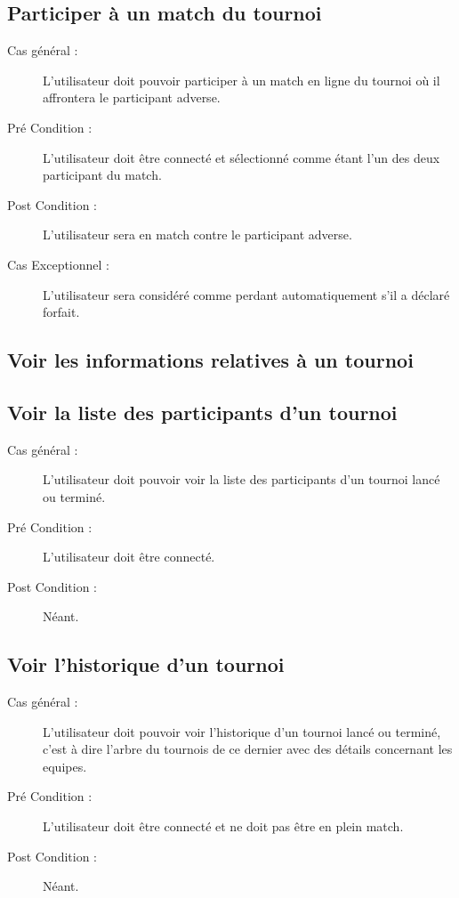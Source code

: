 \documentclass[a4paper]{report}
\begin{document}
\subsection{Participer à un match du tournoi}
\begin{description}
    \item[Cas général :] L'\gls{utilisateur} doit pouvoir participer à un match en ligne du tournoi où il affrontera le \gls{participant} adverse.
    \item[Pré Condition  :] L'\gls{utilisateur} doit être connecté et sélectionné comme étant l'un des deux \gls{participant} du match.
    \item[Post Condition :] L'\gls{utilisateur} sera en match contre le \gls{participant} adverse.
    \item[Cas Exceptionnel :] L'\gls{utilisateur} sera considéré comme perdant automatiquement s'il a déclaré forfait.
\end{description}

\subsection{Voir les informations relatives à un tournoi}
\subsection{Voir la liste des \glspl{participant} d'un tournoi}
\begin{description}
    \item[Cas général :] L'\gls{utilisateur} doit pouvoir voir la liste des \glspl{participant} d'un tournoi lancé ou terminé.
    \item[Pré Condition  :] L'\gls{utilisateur} doit être connecté.
    \item[Post Condition :] Néant.
\end{description}
\subsection{Voir l'historique d'un tournoi}
\begin{description}
    \item[Cas général :] L'\gls{utilisateur} doit pouvoir voir l'historique d'un tournoi lancé ou terminé, c'est à dire l'arbre du tournois de ce dernier avec des détails concernant les \glspl{equipe}.
    \item[Pré Condition  :] L'\gls{utilisateur} doit être connecté et ne doit pas être en plein match.
    \item[Post Condition :] Néant.
\end{description}
\end{document}
